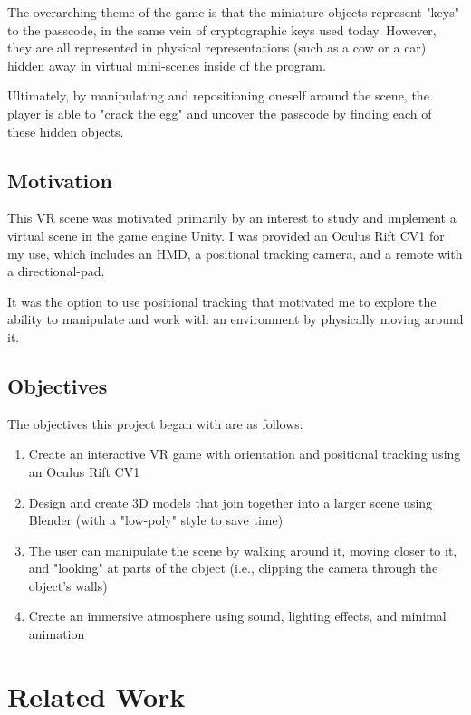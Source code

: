 \documentclass[10pt,twocolumn,letterpaper]{article}
\begin{document}
The overarching theme of the game is that the miniature objects represent "keys" to the passcode, in the same vein of cryptographic keys used today. However, they are all represented in physical representations (such as a cow or a car) hidden away in virtual mini-scenes inside of the program.

Ultimately, by manipulating and repositioning oneself around the scene, the player is able to "crack the egg" and uncover the passcode by finding each of these hidden objects.

\subsection{Motivation}

This VR scene was motivated primarily by an interest to study and implement a virtual scene in the game engine Unity. I was provided an Oculus Rift CV1 for my use, which includes an HMD, a positional tracking camera, and a remote with a directional-pad.

It was the option to use positional tracking that motivated me to explore the ability to manipulate and work with an environment by physically moving around it.

\subsection{Objectives}

The objectives this project began with are as follows:

\begin{enumerate}
  \item Create an interactive VR game with orientation and positional tracking using an Oculus Rift CV1
  \item Design and create 3D models that join together into a larger scene using Blender (with a "low-poly" style to save time)
  \item The user can manipulate the scene by walking around it, moving closer to it, and "looking" at parts of the object (i.e., clipping the camera through the object's walls)
  \item Create an immersive atmosphere using sound, lighting effects, and minimal animation
\end{enumerate}


\section{Related Work}
\end{document}
